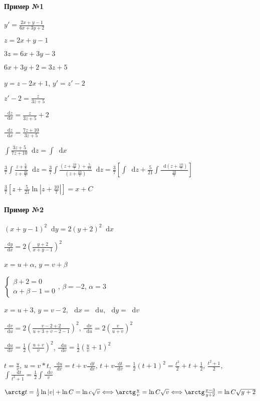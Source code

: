 \documentclass{article}
\newcommand*\diff{\mathop{}\!\mathrm{d}}
\begin{document}
\begin{minipage}{0.49\textwidth}
\paragraph{Пример №1} $y' = \frac{2 x + y - 1}{6x + 3y + 2}$

$z = 2x + y - 1$

$3z = 6x + 3y - 3$

$6x + 3y + 2 = 3z + 5$

$y = z - 2x + 1$, $y' = z' - 2$

$z' - 2 = \frac{z}{3z + 5}$

$\frac{\diff z}{\diff x} = \frac{z}{3z + 5} + 2$

$\frac{\diff z}{\diff x} = \frac{7z + 10}{3z + 5}$

$\int \frac{3z + 5}{7z + 10} \diff z = \int \diff x$

$\frac{3}{7} \int \frac{z + \frac{5}{3}}{z + \frac{10}{7}} \diff z = \frac{3}{7} \int \frac{(z + \frac{10}{7}) + \frac{5}{21}}{(z + \frac{10}{7})} \diff z = \frac{3}{7} [\int \diff z + \frac{5}{21} \int \frac{\diff (z + \frac{10}{7})}{\frac{10}{7}}]$

$\frac{3}{7} [z + \frac{5}{21} \ln |z + \frac{10}{7}|] = x + C$
\end{minipage}
\begin{minipage}{0.49\textwidth}
    \paragraph{Пример №2} $(x + y - 1)^2 \diff y = 2 (y + 2)^2 \diff x$

    $\frac{\diff y}{\diff x} = 2 (\frac{y + 2}{x + y - 1})^2$

    $x = u + \alpha$, $y = v + \beta$

    $\begin{cases}
        \beta + 2 = 0 \\
        \alpha + \beta - 1 = 0
    \end{cases}$, $\beta = -2$, $\alpha = 3$

    $x = u + 3$, $y = v - 2$, $\diff x = \diff u$, $\diff y = \diff v$

    $\frac{\diff v}{\diff u} = 2 (\frac{v - 2 + 2}{u + 3 + v - 2 - 1})^2$, $\frac{\diff v}{\diff u} = 2 (\frac{v}{u + v})^2$

    $\frac{\diff u}{\diff v} = \frac{1}{2} (\frac{u + v}{v})^2$, $\frac{\diff u}{\diff v} = \frac{1}{2} (\frac{u}{v} + 1)^2$

    $t = \frac{u}{v}$, $u = v * t$, $\frac{\diff u}{\diff v} = t + v \frac{\diff t}{\diff v}$, $t + v \frac{\diff t}{\diff v} = \frac{1}{2} (t + 1)^2 = \frac{t^2}{2} + t + \frac{1}{2}$, $\frac{t^2 + 1}{2}$, $\int \frac{\diff t}{t^2 + 1} = \frac{1}{2} \int \frac{\diff v}{v}$

    $\arctg t = \frac{1}{2} \ln |v| + \ln C = \ln c \sqrt{v} \Longleftrightarrow \arctg \frac{u}{v} = \ln C \sqrt{v} \Longleftrightarrow \arctg \frac{x - 3}{y + 2} = \ln C \sqrt{y + 2}$
\end{minipage}
\end{document}
